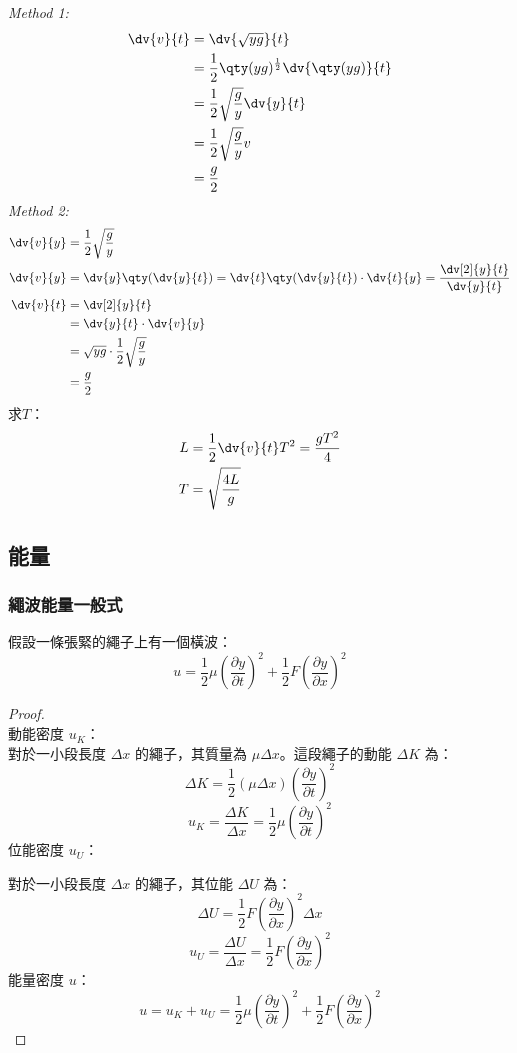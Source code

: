 \documentclass[a4paper,12pt]{report}
\begin{document}
\textit{Method 1:}
\[\begin{aligned}
\dv{v}{t} &= \dv{\sqrt{yg}}{t}\\
&= \frac{1}{2}\qty(yg)^\frac{1}{2}\dv{\qty(yg)}{t}\\
&= \frac{1}{2}\sqrt{\frac{g}{y}}\dv{y}{t}\\
&= \frac{1}{2}\sqrt{\frac{g}{y}}v\\
&= \frac{g}{2}\\
\end{aligned}\]
\textit{Method 2:}
\[\begin{aligned}
\dv{v}{y} &= \frac{1}{2}\sqrt{\frac{g}{y}}\\
\dv{v}{y} &= \dv{y}\qty(\dv{y}{t})=\dv{t}\qty(\dv{y}{t})\cdot\dv{t}{y}=\frac{\dv[2]{y}{t}}{\dv{y}{t}}\\
\dv{v}{t} &= \dv[2]{y}{t} \\
&= \dv{y}{t}\cdot\dv{v}{y} \\
&= \sqrt{yg}\cdot\frac{1}{2}\sqrt{\frac{g}{y}}\\
&= \frac{g}{2}
\end{aligned}\]
求$T$：
\[\begin{aligned}
L &= \frac{1}{2}\dv{v}{t}T^2 = \frac{gT^2}{4}\\
T &= \sqrt{\frac{4L}{g}}
\end{aligned}\]
\subsection{能量}
\subsubsection{繩波能量一般式}
假設一條張緊的繩子上有一個橫波：
\[ u = \frac{1}{2} \mu \left( \frac{\partial y}{\partial t} \right)^2 + \frac{1}{2} F \left( \frac{\partial y}{\partial x} \right)^2 \]
\begin{proof}\mbox{}\\
動能密度 \( u_K \)：\\
對於一小段長度 \(\Delta x\) 的繩子，其質量為 \(\mu \Delta x\)。這段繩子的動能 \(\Delta K\) 為：
\[ \Delta K = \frac{1}{2} (\mu \Delta x) \left( \frac{\partial y}{\partial t} \right)^2 \]
\[ u_K = \frac{\Delta K}{\Delta x} = \frac{1}{2} \mu \left( \frac{\partial y}{\partial t} \right)^2 \]
位能密度 \( u_U \)：

對於一小段長度 \(\Delta x\) 的繩子，其位能 \(\Delta U\) 為：
\[ \Delta U = \frac{1}{2} F \left( \frac{\partial y}{\partial x} \right)^2 \Delta x \]
\[ u_U = \frac{\Delta U}{\Delta x} = \frac{1}{2} F \left( \frac{\partial y}{\partial x} \right)^2 \]
能量密度 \( u \)：
\[ u = u_K + u_U = \frac{1}{2} \mu \left( \frac{\partial y}{\partial t} \right)^2 + \frac{1}{2} F \left( \frac{\partial y}{\partial x} \right)^2 \]
\end{proof}
\end{document}
